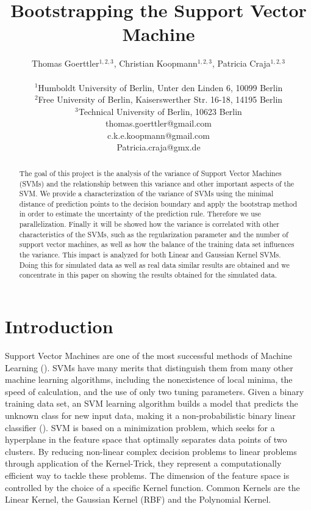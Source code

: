 \documentclass[a4paper]{article}
\title{Bootstrapping the Support Vector Machine}
\author{Thomas Goerttler$^{1,2,3}$, Christian Koopmann$^{1,2,3}$, Patricia Craja$^{1,2,3}$ \\
\mbox{}\\
$^1$Humboldt University of Berlin, Unter den Linden 6, 10099 Berlin \\
$^2$Free University of Berlin, Kaiserswerther Str. 16-18, 14195 Berlin \\
$^3$Technical University of Berlin, 10623 Berlin \\
thomas.goerttler@gmail.com\\
c.k.e.koopmann@gmail.com\\
Patricia.craja@gmx.de\\
}
\begin{document}
\maketitle


\begin{abstract}
The goal of this project is the analysis of the variance of Support Vector Machines (SVMs) and the relationship between this variance and other important aspects of the SVM. We provide a characterization of the variance of SVMs using the minimal distance of prediction points to the decision boundary and apply the bootstrap method in order to estimate the uncertainty of the prediction rule. Therefore we use parallelization. Finally it will be showed how the variance is correlated with other characteristics of the SVMs, such as the regularization parameter and the number of support vector machines, as well as how the balance of the training data set influences the variance. This impact is analyzed for both Linear and Gaussian Kernel SVMs. Doing this for simulated data as well as real data similar results are obtained and we concentrate in this paper on showing the results obtained for the simulated data. 
  
\end{abstract}

\section{Introduction}

Support Vector Machines are one of the most successful methods of Machine Learning (\cite{steinwart_support_2008}). SVMs have many merits that distinguish them from many other machine learning algorithms, including the nonexistence of local minima, the speed of calculation, and the use of only two tuning parameters. Given a binary training data set, an SVM learning algorithm builds a model that predicts the unknown class for new input data, making it a non-probabilistic binary linear classifier (\cite{cristianini_introduction_2000}). SVM is based on a minimization problem, which seeks for a hyperplane in the feature space that optimally separates data points of two clusters.  By reducing non-linear complex decision problems to linear problems through application of the Kernel-Trick, they represent a computationally efficient way to tackle these problems. The dimension of the feature space is controlled by the choice of a specific Kernel function. Common Kernels are the Linear Kernel, the Gaussian Kernel (RBF) and the Polynomial Kernel.
\end{document}

